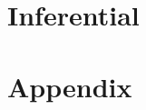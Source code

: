 \documentclass[ twoside,openright,titlepage,numbers=noenddot,headinclude,
footinclude=true,cleardoublepage=empty,abstractoff, 
BCOR=5mm,fontsize=11pt,american]{scrreprt}
\begin{document}
\part{Inferential}



%

\part{Appendix}


\leavevmode\thispagestyle{empty}\newpage
\leavevmode\thispagestyle{empty}\newpage
\end{document}

